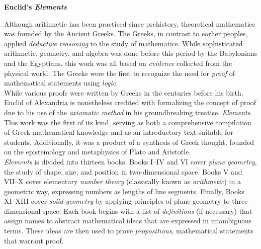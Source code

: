 \begin{tcolorbox}[breakable, enhanced, colback=textbook-blue, sharp corners]
	\vspace{3mm}
	\begin{center}
		\textbf{Euclid's \textit{Elements}}
	\end{center}
	Although arithmetic has been practiced since prehistory, theoretical mathematics was founded by the Ancient Greeks. The Greeks, in contrast to earlier peoples, applied \textit{deductive reasoning} to the study of mathematics. While sophisticated arithmetic, geometry, and algebra was done before this period by the Babylonians and the Egyptians, this work was all based on \textit{evidence} collected from the physical world. The Greeks were the first to recognize the need for \textit{proof} of mathematical statements using \textit{logic}. \\
	
	
	While various proofs were written by Greeks in the centuries before his birth, Euclid of Alexandria is nonetheless credited with formalizing the concept of proof due to his use of the \textit{axiomatic method} in his groundbreaking treatise, \textit{Elements}. This work was the first of its kind, serving as both a comprehensive compilation of Greek mathematical knowledge and as an introductory text suitable for students. Additionally, it was a product of a synthesis of Greek thought, founded on the epistemology and metaphysics of Plato and Aristotle. \\
	
	\textit{Elements} is divided into thirteen books. Books I--IV and VI cover \textit{plane geometry}, the study of shape, size, and position in two-dimensional space. Books V and VII--X cover elementary \textit{number theory} (classically known as \textit{arithmetic}) in a geometric way, expressing numbers as lengths of line segments. Finally, Books XI--XIII cover \textit{solid geometry} by applying principles of plane geometry to three-dimensional space. Each book begins with a list of \textit{definitions} (if necessary) that assign names to abstract mathematical ideas that are expressed in unambiguous terms. These ideas are then used to prove \textit{propositions}, mathematical statements that warrant proof. \\
	

\end{tcolorbox}
